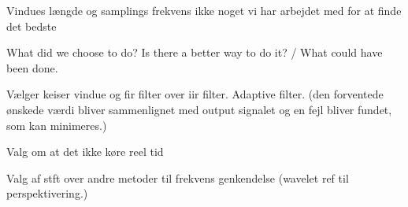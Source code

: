 Vindues længde og samplings frekvens ikke noget vi har arbejdet med for at finde det bedste


What did we choose to do? Is there a better way to do it? / What could have been done.


Vælger keiser vindue og fir filter
over iir filter.
Adaptive filter. (den forventede ønskede værdi bliver sammenlignet med output signalet og en fejl bliver fundet, som kan minimeres.)

Valg om at det ikke køre reel tid


Valg af stft over andre metoder til frekvens genkendelse (wavelet ref til perspektivering.)




